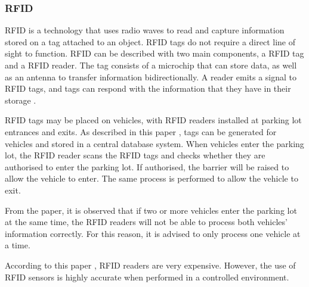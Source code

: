 \subsubsection*{\ac{RFID}}
\ac{RFID} is a technology that uses radio waves to read and capture information stored on a tag attached to an object. \ac{RFID} tags do not require a direct line of sight to function. \ac{RFID} can be described with two main components, a \ac{RFID} tag and a \ac{RFID} reader. The tag consists of a microchip that can store data, as well as an antenna to transfer information bidirectionally. A reader emits a signal to \ac{RFID} tags, and tags can respond with the information that they have in their storage \citep{Want2006AnRFID}.

\ac{RFID} tags may be placed on vehicles, with \ac{RFID} readers installed at parking lot entrances and exits. As described in this paper \citep{pala_smart_2007}, tags can be generated for vehicles and stored in a central database system. When vehicles enter the parking lot, the \ac{RFID} reader scans the \ac{RFID} tags and checks whether they are authorised to enter the parking lot. If authorised, the barrier will be raised to allow the vehicle to enter. The same process is performed to allow the vehicle to exit.

From the paper, it is observed that if two or more vehicles enter the parking lot at the same time, the \ac{RFID} readers will not be able to process both vehicles' information correctly. For this reason, it is advised to only process one vehicle at a time.

According to this paper \citep{dokur_embedded_2016}, \ac{RFID} readers are very expensive. However, the use of \ac{RFID} sensors is highly accurate when performed in a controlled environment.